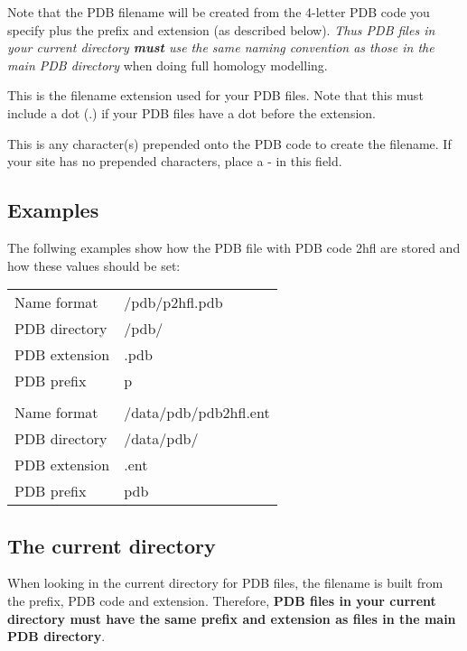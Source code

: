 \documentclass[12pt]{article}
\newcommand{\appsection}[1]{\par\vspace{1ex}\noindent{\bfseries #1}\par\noindent}
\begin{document}
Note that the PDB filename will be created from the 4-letter PDB code
you specify plus the prefix and extension (as described
below). \emph{Thus PDB files in your current directory {\bfseries
must} use the same naming convention as those in the main PDB
directory} when doing full homology modelling.

\appsection{PDB Extension}
\noindent This is the filename extension used for your PDB files. Note
that this must include a dot (.) if your PDB files have a dot before
the extension.

\appsection{PDB Prefix}
\noindent This is any character(s) prepended onto the PDB code to
create the filename. If your site has no prepended characters, place a
- in this field.



\subsection{Examples}
\noindent The follwing examples show how the PDB file with PDB code
2hfl are stored and how these values should be set:

\begin{center}
\begin{tabular}{ll}
Name format        &    /pdb/p2hfl.pdb          \\
PDB directory      &    /pdb/                   \\
PDB extension      &    .pdb                    \\
PDB prefix         &    p                       \\
                   &                            \\
Name format        &    /data/pdb/pdb2hfl.ent   \\
PDB directory      &    /data/pdb/              \\
PDB extension      &    .ent                    \\
PDB prefix         &    pdb                     \\
\end{tabular}
\end{center}

\subsection{The current directory}
\noindent When looking in the current directory for PDB files, the
filename is built from the prefix, PDB code and extension. Therefore,
{\bfseries PDB files in your current directory must have the same prefix and
extension as files in the main PDB directory}.
\end{document}
